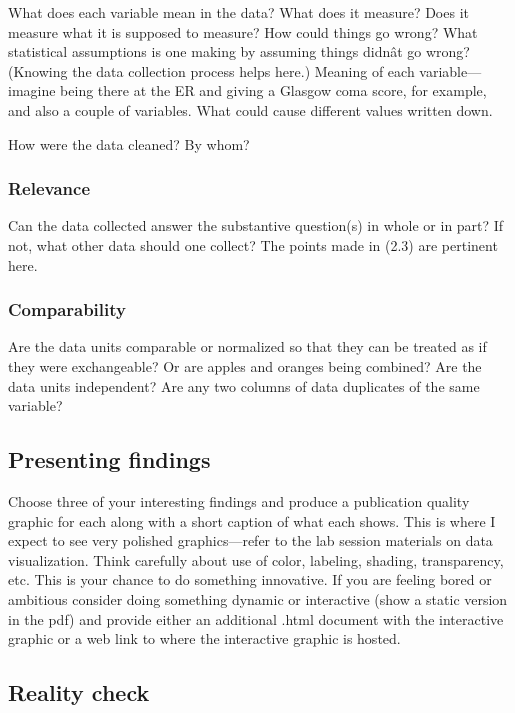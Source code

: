 \documentclass[10pt,letterpaper]{article}
\begin{document}
What does each variable mean in the data? What does it measure? Does it measure what it is supposed to measure? How could things go wrong? What statistical assumptions is one making by assuming things didnât go wrong? (Knowing the data collection process helps here.) Meaning of each variable---imagine being there at the ER and giving a Glasgow coma score, for example, and also a couple of variables. What could cause different values written down.

How were the data cleaned? By whom?

\subsubsection*{Relevance}

Can the data collected answer the substantive question(s) in whole or in part? If not, what other data should one collect? The points made in (2.3) are pertinent here.

\subsubsection*{Comparability}

Are the data units comparable or normalized so that they can be treated as if they were exchangeable? Or are apples and oranges being combined? Are the data units independent? Are any two columns of data duplicates of the same variable?

\subsection*{Presenting findings}

Choose three of your interesting findings and produce a publication quality graphic for each along with a short caption of what each shows. This is where I expect to see very polished graphics---refer to the lab session materials on data visualization. Think carefully about use of color, labeling, shading, transparency, etc. This is your chance to do something innovative. If you are feeling bored or ambitious consider doing something dynamic or interactive (show a static version in the pdf) and provide either an additional .html document with the interactive graphic or a web link to where the interactive graphic is hosted.

\subsection*{Reality check}
\end{document}
